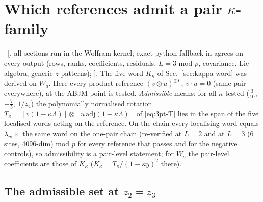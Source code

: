 \section{Which references admit a pair $\kappa$-family}\label{sec:admiss}

\ex\ [, all sections run in the Wolfram kernel; exact python fallback in  agrees on every output (rows, ranks, coefficients, residuals, $L=3$ mod $p$, covariance, Lie algebra, generic-$z$ patterns); ].
The five-word $K_\kappa$ of Sec.~\ref{sec:kappa-word} was derived on $W_a$. Here every product reference $(v\otimes u)^{\otimes L}$, $v\cdot u=0$ (same pair everywhere), at the ABJM point is tested.
\emph{Admissible} means: for all $\kappa$ tested ($\tfrac3{10}$, $-\tfrac75$, $1/z_4$) the polynomially normalised rotation
$T_\kappa=[v(1-\kappa\Lambda)]\otimes[u\,\mathrm{adj}(1-\kappa\Lambda)]$ of \eqref{eq:3pt-T} lies in the span of the five localised words acting on the reference. On the chain every localising word equals $\lambda_w\times$ the same word on the one-pair chain
(re-verified at $L=2$ and at $L=3$ (6 sites, 4096-dim) mod $p$ for every reference that passes and for the negative controls), so admissibility is a pair-level statement; for $W_a$ the pair-level coefficients are those of $K_\kappa$ ($K_\kappa=T_\kappa/(1-\kappa y)^2$ there).

\subsection{The admissible set at $z_2=z_3$}\label{sec:admiss-set}

